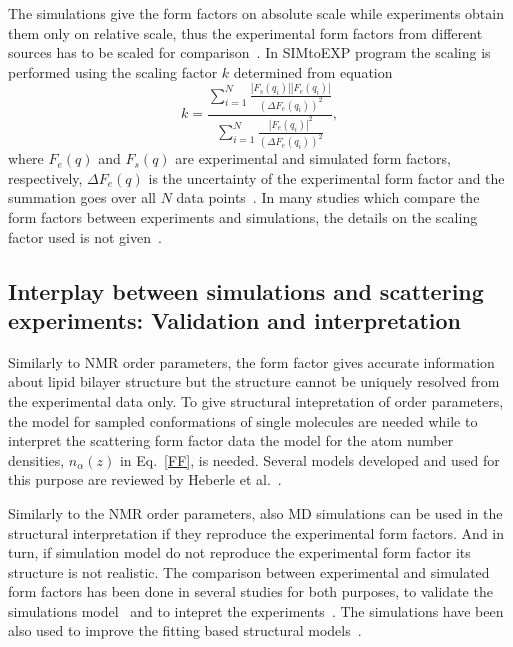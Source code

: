 \documentclass[aps,prl,superscriptaddress,twocolumn]{revtex4}
\begin{document}
The simulations give the form factors on absolute scale while experiments obtain them only on relative scale,
thus the experimental form factors from different sources has to be scaled for comparison~\cite{kucerka08a,kucerka10}.
In SIMtoEXP program the scaling is performed using the scaling factor $k$ determined from equation
\begin{equation}
k=\frac{\sum_{i=1}^N\frac{|F_s(q_i)||F_e(q_i)|}{(\Delta F_e(q_i))^2}}{\sum_{i=1}^N\frac{|F_e(q_i)|^2}{(\Delta F_e(q_i))^2}},
\end{equation} 
where $F_e(q)$ and $F_s(q)$ are experimental and simulated form factors, respectively, $\Delta F_e(q)$ is the uncertainty
of the experimental form factor and the summation goes over all $N$ data points~\cite{kucerka08a,kucerka10}.
In many studies which compare the form factors between experiments and simulations, the details on the scaling
factor used is not given~\cite{??}. 

\onecolumngrid
{}
\twocolumngrid

\subsection{Interplay between simulations and scattering experiments: Validation and interpretation}
Similarly to NMR order parameters, the form factor gives accurate information about lipid
bilayer structure but the structure cannot be uniquely resolved from the experimental data only.
To give structural intepretation of order parameters, the model for sampled conformations of 
single molecules are needed while to interpret the scattering form factor data the model
for the atom number densities, $n_\alpha(z)$ in Eq.~\ref{FF}, is needed.
Several models developed and used for this purpose are reviewed by Heberle et al.~\cite{heberle12}.

Similarly to the NMR order parameters, also MD simulations can be used in the structural
interpretation if they reproduce the experimental form factors. And in turn,
if simulation model do not reproduce the experimental form factor its structure is not 
realistic. The comparison between experimental and simulated form factors has been done 
in several studies for both purposes, to validate the simulations 
model~\cite{hogberg08,chiu09,klauda10,dickson12,jambeck12,lim12,klauda12,jambeck13,chowdhary13,lee14,maciejewski14,dickson14,tjornhammar14,madej15,kulig15b} and to intepret the experiments~\cite{sachs03,klauda06,kucerka08a,kucerka08b,braun13}. 
The simulations have been also used to improve the fitting based structural models~\cite{??}.
\end{document}
